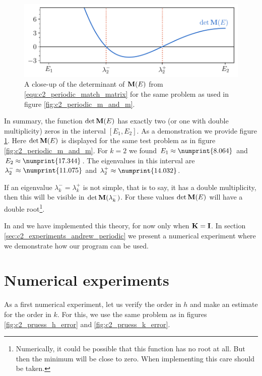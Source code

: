 \begin{figure}
    \begin{center}
        \includegraphics[width=\textwidth]{img/chapter2/prufer/periodic_matching.pdf}
    \end{center}
    \caption{A close-up of the determinant of $\vb{M}(E)$ from \eqref{equ:c2_periodic_match_matrix} for the same problem as used in figure \ref{fig:c2_periodic_m_and_m}.}\label{fig:c2_periodic_matching}
\end{figure}

In summary, the function $\det\vb{M}(E)$ has exactly two (or one with double multiplicity) zeros in the interval $[E_1, E_2]$. As a demonstration we provide figure \ref{fig:c2_periodic_matching}. Here $\det\vb{M}(E)$ is displayed for the same test problem as in figure \ref{fig:c2_periodic_m_and_m}. For $k = 2$ we found $E_1 \approx \numprint{8.064}$ and $E_2 \approx \numprint{17.344}$. The eigenvalues in this interval are $\lambda_2^{-} \approx \numprint{11.075}$ and $\lambda_2^{+} \approx \numprint{14.032}$.

If an eigenvalue $\lambda^{-}_k = \lambda^{+}_k$ is not simple, that is to say, it has a double multiplicity, then this will be visible in $\det\vb{M}(\lambda^{-}_k)$. For these values $\det\vb{M}(E)$ will have a double root\footnote{Numerically, it could be possible that this function has no root at all. But then the minimum will be close to zero. When implementing this care should be taken.}.

In  and \pyslise{} we have implemented this theory, for now only when $\vb{K} = \vb{I}$. In section \ref{sec:c2_experiments_andrew_periodic} we present a numerical experiment where we demonstrate how our program can be used.


\section{Numerical experiments}\label{sec:c2_numerical_experiments}

As a first numerical experiment, let us verify the order in $h$ and make an estimate for the order in $k$. For this, we use the same problem as in figures \ref{fig:c2_pruess_h_error} and \ref{fig:c2_pruess_k_error}.

